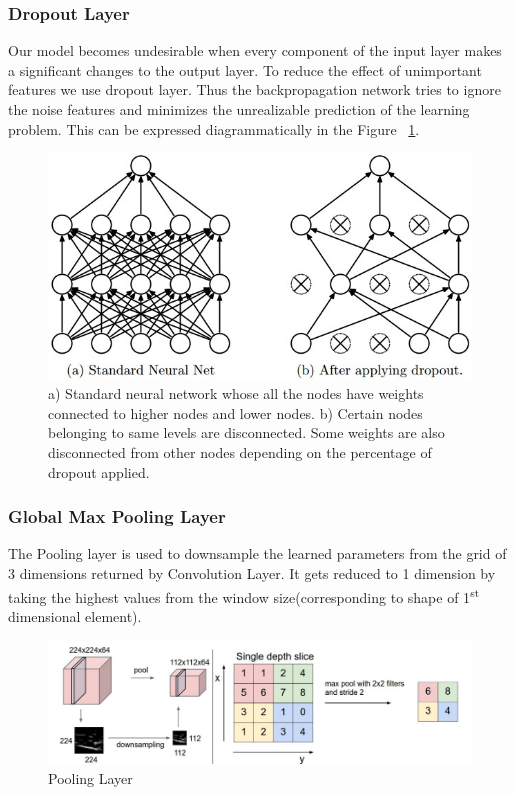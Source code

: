 \subsubsection{Dropout Layer}
Our model becomes undesirable when every component of the input layer makes a significant changes to the output layer. To reduce the effect of unimportant features we use dropout layer. Thus the backpropagation network tries to ignore the noise features and minimizes the unrealizable prediction of the learning problem. This can be expressed diagrammatically in the Figure ~\ref{fig:dropout}.
\begin{figure}
  [ht] \centering
  \includegraphics[width=.5\linewidth]{mainmatter/3-Methodology/images/dropout.jpeg}
  \caption[Dropout Layer]{a) Standard neural network whose all the nodes have weights connected to higher nodes and lower nodes. b) Certain nodes belonging to same levels are disconnected. Some weights are also disconnected from other nodes depending on the percentage of dropout applied.}
  \label{fig:dropout}

\end{figure}

\subsubsection{Global Max Pooling Layer}
The Pooling layer is used to downsample the learned parameters from the grid of 3 dimensions returned by Convolution Layer. It gets reduced to 1 dimension by taking the highest values from the window size(corresponding to shape of 1\textsuperscript{st} dimensional element).
\begin{figure}
  [ht]\centering
  \includegraphics[width=.75\linewidth]{mainmatter/3-Methodology/images/pooling.png}
  \caption{Pooling Layer}
  \label{fig:pool_layer}
\end{figure}

